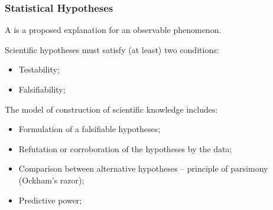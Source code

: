 \documentclass[10pt]{beamer}
\begin{document}
\begin{frame}
  \frametitle{Statistical Hypotheses}
  {\small
  A  is a proposed explanation for an observable phenomenon.
  
  Scientific hypotheses must satisfy (at least) two conditions:
  \begin{itemize}
  \item Testability;
  \item Falsifiability;
  \end{itemize}

  \bigskip

  The  model of construction of
  scientific knowledge includes:
  \begin{itemize}
  \item Formulation of a falsifiable hypotheses;
  \item Refutation or corroboration of the hypotheses by the data;
  \item Comparison between alternative hypotheses -- principle of
    parsimony (Ockham's razor);
  \item Predictive power;
  \end{itemize}}

\end{frame}
\end{document}
